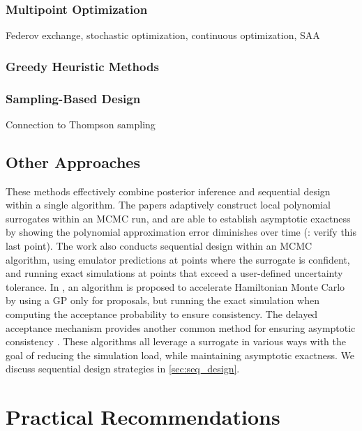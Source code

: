 \documentclass[12pt]{article}
\begin{document}
\subsubsection{Multipoint Optimization}
Federov exchange, stochastic optimization, continuous optimization, SAA

\subsubsection{Greedy Heuristic Methods} \label{sec:batch-heuristic}
\subsubsection{Sampling-Based Design}
Connection to Thompson sampling

\subsection{Other Approaches}
These methods effectively combine posterior
inference and sequential design within a single algorithm.
The papers \citet{Li_2014,ConradLocalExactMCMC} 
adaptively construct local polynomial surrogates within an MCMC run, and are able to establish asymptotic 
exactness by showing the polynomial 
approximation error diminishes over time (\todo: verify this last point). The work \citep{ActiveLearningMCMC}
also conducts sequential design within an MCMC algorithm, using emulator predictions at points where the 
surrogate is confident, and running exact simulations at points that exceed a user-defined uncertainty tolerance.
In \citet{MCMC_GP_proposal}, an algorithm is proposed to accelerate Hamiltonian Monte Carlo by using a 
GP only for proposals, but running the exact simulation when computing the acceptance probability to 
ensure consistency. The delayed acceptance mechanism provides another common method for ensuring
asymptotic consistency \citep{DelayedAcceptance}.
These algorithms all leverage a surrogate in various ways with the goal of reducing the simulation load, while
maintaining asymptotic exactness. We discuss sequential design strategies in \cref{sec:seq_design}.


\section{Practical Recommendations} \label{sec:recs}
\end{document}

